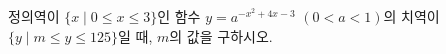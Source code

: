 정의역이 $\{x\mid 0\le x\le 3\}$인 함수 $y=a^{-x^2+4x-3}$ $(0<a<1)$의 치역이 $\{y\mid m\le y\le 125\}$일 때, $m$의 값을 구하시오.
